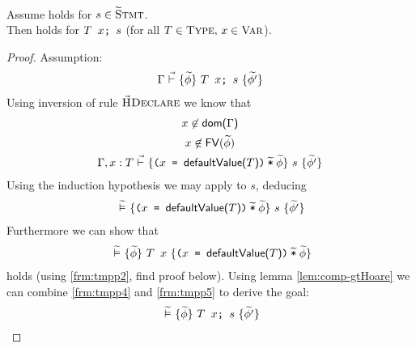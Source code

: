 \begin{lemma}
    \label{lemma:is-decl}~\\
    Assume  holds for $s \in \textup{\textsc{\ensuremath{\widetilde{\text{S}}}tmt}}$.\\
    Then  holds for $\textup{\texttt{{\textup{\texttt{$T$~$x$}}};~{$s$}}}$ (for all $T \in \textup{\textsc{Type}},\, x \in \textup{\textsc{Var}}$).
\end{lemma}
\begin{proof}
    Assumption:
    \begin{align}
    {\Gamma} \,\,\vec{\vdash}\,\, \{{\widetilde{\phi}}\} ~{\textup{\texttt{{\textup{\texttt{${T}$~${x}$}}};~{$s$}}}}~ \{{\widetilde{\phi'}}\}
    \end{align}
    Using inversion of rule $\textup{\textsc{\ensuremath{\vec{\text{H}}}Declare}}$ we know that
    \begin{gather}
    \label{frm:tmpp1}
    {x} \not\in \textup{\textmd{\textsf{dom($\Gamma$)}}} \\
    \label{frm:tmpp2}
    {x} \not \in {\textup{\textmd{\textsf{FV}}}(\widetilde{\phi})} \\
    {{\Gamma}, {x} : {T}} \,\,\vec{\vdash}\,\, \{{\textup{\texttt{${\textup{\texttt{(${\textup{\texttt{${x}$}}}$ = ${\textup{\texttt{${\textup{\textmd{\textsf{defaultValue(${T}$)}}}}$}}}$)}}}$\:$\widetilde{\textup{\texttt{*}}}$\:$\widetilde{\phi}$}}}\} ~{s}~ \{{\widetilde{\phi'}}\}
    \end{gather}
    Using the induction hypothesis we may apply  to $s$, deducing
    \begin{gather}
    \label{frm:tmpp4}
    {} \,\,\widetilde{\vDash}\,\, \{{\textup{\texttt{${\textup{\texttt{(${\textup{\texttt{${x}$}}}$ = ${\textup{\texttt{${\textup{\textmd{\textsf{defaultValue(${T}$)}}}}$}}}$)}}}$\:$\widetilde{\textup{\texttt{*}}}$\:$\widetilde{\phi}$}}}\} ~{s}~ \{{\widetilde{\phi'}}\}
    \end{gather}
    Furthermore we can show that
    \begin{gather}
    \label{frm:tmpp5}
    {} \,\,\widetilde{\vDash}\,\, \{{\widetilde{\phi}}\} ~{\textup{\texttt{${T}$~${x}$}}}~ \{{\textup{\texttt{${\textup{\texttt{(${\textup{\texttt{${x}$}}}$ = ${\textup{\texttt{${\textup{\textmd{\textsf{defaultValue(${T}$)}}}}$}}}$)}}}$\:$\widetilde{\textup{\texttt{*}}}$\:$\widetilde{\phi}$}}}\}
    \end{gather}
    holds (using \ref{frm:tmpp2}, find proof below).
    Using lemma \ref{lem:comp-gtHoare} we can combine \ref{frm:tmpp4} and \ref{frm:tmpp5} to derive the goal:
    \begin{align}
    {} \,\,\widetilde{\vDash}\,\, \{{\widetilde{\phi}}\} ~{\textup{\texttt{{\textup{\texttt{${T}$~${x}$}}};~{$s$}}}}~ \{{\widetilde{\phi'}}\}
    \end{align}
    

\end{proof}

